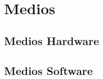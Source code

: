 
\newpage
\section{Medios}
\label{sec:means}

\subsection{Medios Hardware}
\label{subsec:hardware}

\subsection{Medios Software}
\label{subsec:Software}